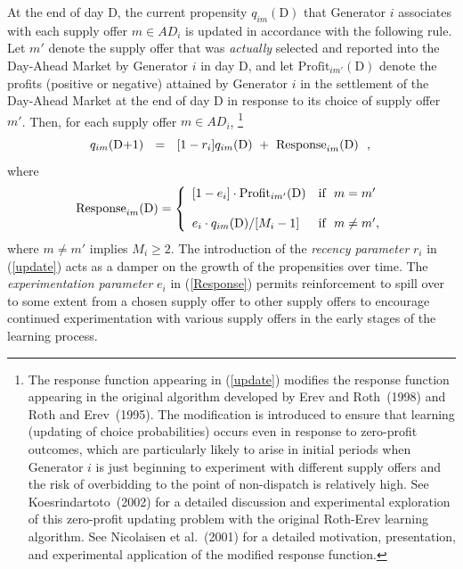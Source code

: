 \documentclass[12pt]{article}
\begin{document}
    At the end of day D, the current propensity $q_{im}(\mbox{D})$
that Generator $i$ associates with each supply offer $m \in AD_i$ is updated
in accordance with the following rule.  Let $m'$ denote the supply offer that
was {\it actually\/} selected and reported into the Day-Ahead Market by Generator $i$ 
in day D, and let $\mbox{Profit}_{im'}(\mbox{D})$ denote the profits (positive or negative) attained
by Generator $i$ in the settlement of the Day-Ahead Market at the end of day D 
in response to its choice of supply offer $m'$.  Then, for each supply offer $m \in AD_i$,%
       \footnote{The response function appearing in (\ref{update}) modifies 
the response function appearing in the
original algorithm developed by Erev and Roth~(1998) and Roth and
Erev~(1995). The modification is introduced to ensure that learning
(updating of choice probabilities) occurs even in response to zero-profit
outcomes, which are particularly likely to arise in initial periods when
Generator $i$ is just beginning to experiment with different supply offers
and the risk of overbidding to the point of non-dispatch is relatively high. See Koesrindartoto~(2002)
for a detailed discussion and experimental exploration of this zero-profit
updating problem with the original Roth-Erev learning algorithm.  See
Nicolaisen et al.~(2001) for a detailed motivation, presentation, and
experimental application of the modified response function.}
               \begin{equation}
q_{im}(\mbox{D+1}) ~~ = ~~[1-r_{i}] q_{im}(\mbox{D}) ~+~
             \mbox{Response}_{im}(\mbox{D}) ~~, \label{update}\\
                \end{equation}
where
                 \begin{equation}
         \mbox{Response}_{im}(\mbox{D}) = \left\{ \begin{array}{ll} \label{Response}
  [1 - e_{i} ]\cdot \mbox{Profit}_{im'}(\mbox{D})  &  \mbox{if}~~m = m' \\
        \/        &           \\
  e_{i}\cdot q_{im}(\mbox{D})/[M_i - 1]     & \mbox{if} ~~ m \ne m',
                   \end{array} \right.
                     \end{equation}
where $m \ne m'$ implies $M_i \ge 2$.  The introduction of the {\it recency parameter\/} $r_{i} $ in
(\ref{update}) acts as a damper on the growth of the propensities
over time. The {\it experimentation parameter\/} $e_{i} $ in
(\ref{Response}) permits reinforcement to spill over to some extent
from a chosen supply offer to other supply offers to encourage
continued experimentation with various supply offers in the early
stages of the learning process.
\end{document}
